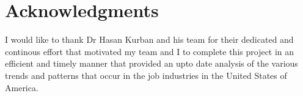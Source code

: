 \documentclass[fleqn,10pt]{SelfArx} %
\begin{document}
\bigskip
\bigskip


\section*{Acknowledgments} %


I would like to thank Dr Hasan Kurban and his team for their dedicated and continous effort that motivated my team and I to complete this project in an efficient and timely manner that provided an upto date analysis of the various trends and patterns that occur in the job industries in the United States of America.


\end{document}
